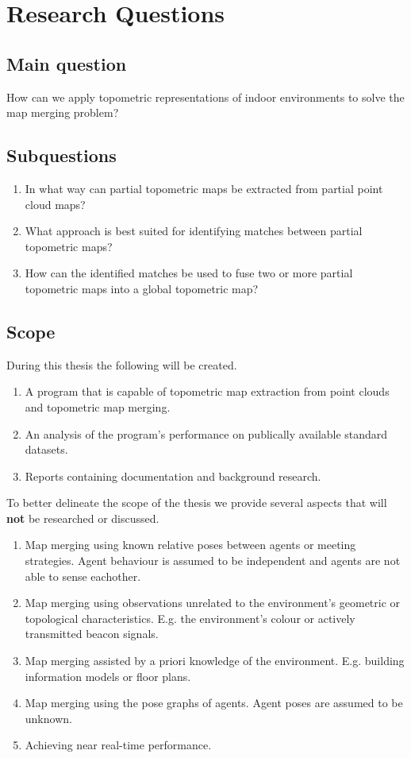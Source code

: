 \section{Research Questions}

\subsection{Main question}
How can we apply topometric representations of indoor environments to solve the map merging problem?

\subsection{Subquestions}
\begin{enumerate}
    \item In what way can partial topometric maps be extracted from partial point cloud maps?
    \item What approach is best suited for identifying matches between partial topometric maps?
    \item How can the identified matches be used to fuse two or more partial topometric maps into a global topometric map?
\end{enumerate}

\subsection{Scope}

During this thesis the following will be created.

\begin{enumerate}
    \item A program that is capable of topometric map extraction from point clouds and topometric map merging.
    \item An analysis of the program's performance on publically available standard datasets.
    \item Reports containing documentation and background research.
\end{enumerate}

To better delineate the scope of the thesis we provide several aspects that will \textbf{not} be researched or discussed. 

\begin{enumerate}
    \item Map merging using known relative poses between agents or meeting strategies. Agent behaviour is assumed to be independent and agents are not able to sense eachother.
    \item Map merging using observations unrelated to the environment's geometric or topological characteristics. E.g. the environment's colour or actively transmitted beacon signals.
    \item Map merging assisted by a priori knowledge of the environment. E.g. building information models or floor plans.
    \item Map merging using the pose graphs of agents. Agent poses are assumed to be unknown.
    \item Achieving near real-time performance.
\end{enumerate}